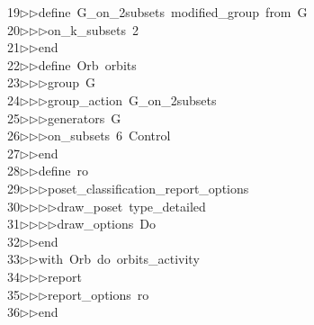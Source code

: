 \begin{tabbing}
19\>$\triangleright$\>$\triangleright$\>define\ G\_on\_2subsets\ modified\_group\ from\ G\ \\[0pt]
20\>$\triangleright$\>$\triangleright$\>$\triangleright$\>on\_k\_subsets\ 2\ \\[0pt]
21\>$\triangleright$\>$\triangleright$\>end\ \\[0pt]
22\>$\triangleright$\>$\triangleright$\>define\ Orb\ orbits\ \\[0pt]
23\>$\triangleright$\>$\triangleright$\>$\triangleright$\>group\ G\ \\[0pt]
24\>$\triangleright$\>$\triangleright$\>$\triangleright$\>group\_action\ G\_on\_2subsets\ \\[0pt]
25\>$\triangleright$\>$\triangleright$\>$\triangleright$\>generators\ G\ \\[0pt]
26\>$\triangleright$\>$\triangleright$\>$\triangleright$\>on\_subsets\ 6\ Control\ \\[0pt]
27\>$\triangleright$\>$\triangleright$\>end\ \\[0pt]
28\>$\triangleright$\>$\triangleright$\>define\ ro\ \\[0pt]
29\>$\triangleright$\>$\triangleright$\>$\triangleright$\>poset\_classification\_report\_options\ \\[0pt]
30\>$\triangleright$\>$\triangleright$\>$\triangleright$\>$\triangleright$\>draw\_poset\ type\_detailed\ \\[0pt]
31\>$\triangleright$\>$\triangleright$\>$\triangleright$\>$\triangleright$\>draw\_options\ Do\ \\[0pt]
32\>$\triangleright$\>$\triangleright$\>end\ \\[0pt]
33\>$\triangleright$\>$\triangleright$\>with\ Orb\ do\ orbits\_activity\ \\[0pt]
34\>$\triangleright$\>$\triangleright$\>$\triangleright$\>report\ \ \\[0pt]
35\>$\triangleright$\>$\triangleright$\>$\triangleright$\>report\_options\ ro\ \\[0pt]
36\>$\triangleright$\>$\triangleright$\>end\ \\[0pt]

\end{tabbing}
